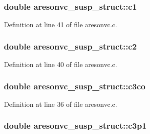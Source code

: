 \subsubsection[{\texorpdfstring{c1}{c1}}]{\setlength{\rightskip}{0pt plus 5cm}double aresonvc\+\_\+susp\+\_\+struct\+::c1}\hypertarget{structaresonvc__susp__struct_a22dbd0b487e025f685fa635f7966636e}{}\label{structaresonvc__susp__struct_a22dbd0b487e025f685fa635f7966636e}


Definition at line 41 of file aresonvc.\+c.

\subsubsection[{\texorpdfstring{c2}{c2}}]{\setlength{\rightskip}{0pt plus 5cm}double aresonvc\+\_\+susp\+\_\+struct\+::c2}\hypertarget{structaresonvc__susp__struct_aadf5ccf821d2f232f58b8ed657669a79}{}\label{structaresonvc__susp__struct_aadf5ccf821d2f232f58b8ed657669a79}


Definition at line 40 of file aresonvc.\+c.

\subsubsection[{\texorpdfstring{c3co}{c3co}}]{\setlength{\rightskip}{0pt plus 5cm}double aresonvc\+\_\+susp\+\_\+struct\+::c3co}\hypertarget{structaresonvc__susp__struct_a01bd70fa672290e84a2f549b935ab042}{}\label{structaresonvc__susp__struct_a01bd70fa672290e84a2f549b935ab042}


Definition at line 36 of file aresonvc.\+c.

\subsubsection[{\texorpdfstring{c3p1}{c3p1}}]{\setlength{\rightskip}{0pt plus 5cm}double aresonvc\+\_\+susp\+\_\+struct\+::c3p1}\hypertarget{structaresonvc__susp__struct_a2ca29ef23bf7e8c0963611ef9fcbd995}{}\label{structaresonvc__susp__struct_a2ca29ef23bf7e8c0963611ef9fcbd995}


